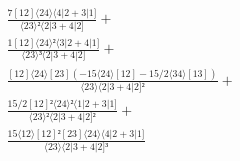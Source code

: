 \documentclass[varwidth, border=5pt]{standalone}
\begin{document}
\begin{my}
$\begin{gathered}
\scriptscriptstyle\frac{7[12]⟨24⟩⟨4|2+3|1]}{⟨23⟩²⟨2|3+4|2]} +\\
\scriptscriptstyle\frac{1[12]⟨24⟩²⟨3|2+4|1]}{⟨23⟩³⟨2|3+4|2]} +\\
\scriptscriptstyle\frac{[12]⟨24⟩[23](-15⟨24⟩[12]-15/2⟨34⟩[13])}{⟨23⟩⟨2|3+4|2]²} +\\
\scriptscriptstyle\frac{15/2[12]²⟨24⟩²⟨1|2+3|1]}{⟨23⟩²⟨2|3+4|2]²} +\\
\scriptscriptstyle\frac{15⟨12⟩[12]²[23]⟨24⟩⟨4|2+3|1]}{⟨23⟩⟨2|3+4|2]³} \phantom{+}
\end{gathered}$
\end{my}
\end{document}
